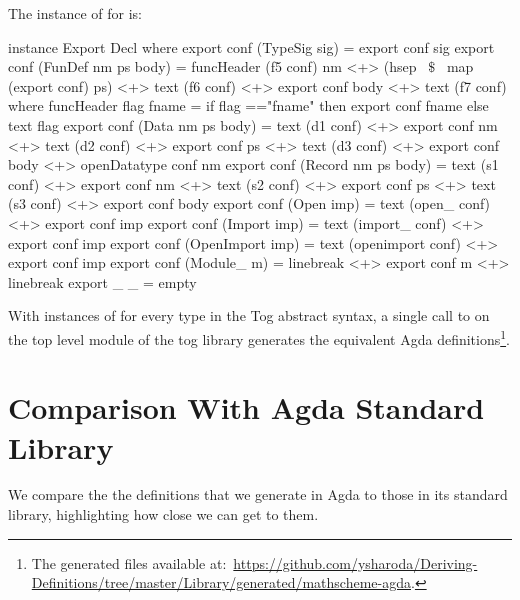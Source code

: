 The instance of  for  is:  
\begin{hscode}
instance Export Decl where
  export conf (TypeSig sig) = export conf sig 
  export conf (FunDef nm ps body) =
    funcHeader (f5 conf) nm <+> (hsep ~$\$$~ map (export conf) ps) 
    <+> text (f6 conf) <+> export conf body <+> text (f7 conf)
    where funcHeader flag fname = 
            if flag =="fname" then export conf fname else text flag    
  export conf (Data nm ps body) =
    text (d1 conf) <+> export conf nm <+> text (d2 conf) 
    <+> export conf ps <+> text (d3 conf) <+> export conf body 
    <+> openDatatype conf nm
  export conf (Record nm ps body) =
    text (s1 conf) <+> export conf nm <+> text (s2 conf) 
    <+> export conf ps <+> text (s3 conf) <+> export conf body 
  export conf (Open imp) = text (open_ conf) <+> export conf imp
  export conf (Import imp) = text (import_ conf) <+> export conf imp
  export conf (OpenImport imp) = 
    text (openimport conf) <+> export conf imp
  export conf (Module_ m) =
    linebreak <+> export conf m  <+> linebreak 
  export _ _ = empty
\end{hscode}

With instances of  for every type in the Tog abstract syntax, a single call to  on the top level module of the tog library generates the equivalent Agda definitions\footnote{The generated files available at:~\url{https://github.com/ysharoda/Deriving-Definitions/tree/master/Library/generated/mathscheme-agda}.}.

\section{Comparison With Agda Standard Library}
\label{sec:compasion_agda_stdlib}
We compare the the definitions that we generate in Agda to those in its standard library, highlighting how close we can get to them. 

